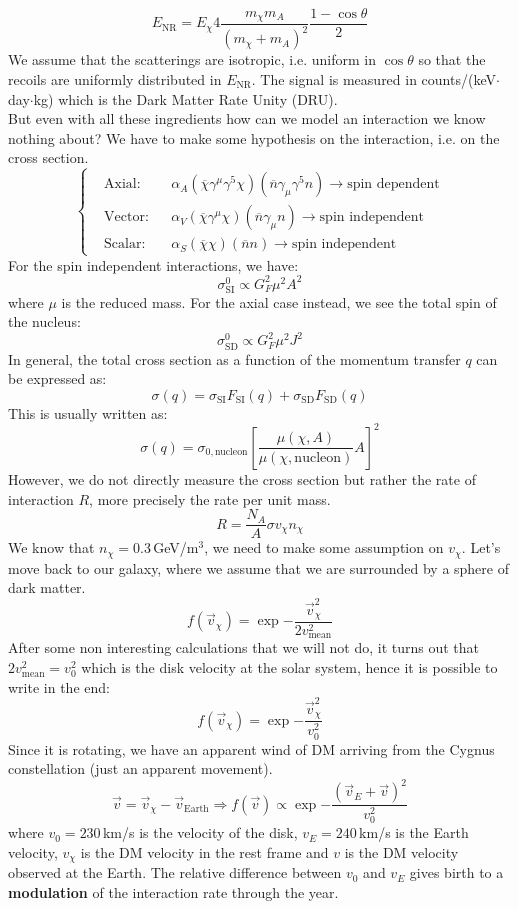\documentclass[10.75pt,a4paper,openright,bottom=2cm]{article}
\begin{document}
\[
E_{\text{NR}}=E_\chi 4\frac{m_\chi m_A}{(m_\chi+m_A)^2}\frac{1-\cos\theta}{2}
\]
We assume that the scatterings are isotropic, i.e. uniform in $\cos\theta$ so that the recoils are uniformly distributed in $E_{\text{NR}}$. The signal is measured in counts/(keV$\cdot$day$\cdot$kg) which is the Dark Matter Rate Unity (DRU).\\
But even with all these ingredients how can we model an interaction we know nothing about? We have to make some hypothesis on the interaction, i.e. on the cross section.
\[
\left\{
\begin{aligned}
&\text{Axial:}&&\alpha_A(\overline{\chi}\gamma^\mu\gamma^5\chi)(\overline{n}\gamma_\mu\gamma^5n)\to\text{spin dependent}\\
&\text{Vector:}&&\alpha_V(\overline{\chi}\gamma^\mu\chi)(\overline{n}\gamma_\mu n)\to\text{spin independent}\\
&\text{Scalar:}&&\alpha_S(\overline{\chi}\chi)(\overline{n}n)\to\text{spin independent}
\end{aligned}
\right.
\]
For the spin independent interactions, we have:
\[
\sigma_{\text{SI}}^0\propto G_F^2\mu^2A^2
\]
where $\mu$ is the reduced mass. For the axial case instead, we see the total spin of the nucleus:
\[
\sigma_{\text{SD}}^0\propto G_F^2\mu^2J^2
\]
In general, the total cross section as a function of the momentum transfer $q$ can be expressed as:
\[
\sigma(q)=\sigma_{\text{SI}}F_{\text{SI}}(q)+\sigma_{\text{SD}}F_{\text{SD}}(q)
\]
This is usually written as:
\[
\sigma(q)=\sigma_{0,\text{nucleon}}\left[\frac{\mu(\chi,A)}{\mu(\chi,\text{nucleon})}A\right]^2
\]
However, we do not directly measure the cross section but rather the rate of interaction $R$, more precisely the rate per unit mass.
\[
R=\frac{N_A}{A}\sigma v_\chi n_\chi
\]
We know that $n_\chi=0.3$\,GeV/m$^3$, we need to make some assumption on $v_\chi$. Let's move back to our galaxy, where we assume that we are surrounded by a sphere of dark matter.
\[
f(\Vec{v}_\chi)=\exp{-\frac{\Vec{v}_\chi^2}{2v_{\text{mean}}^2}}
\]
After some non interesting calculations that we will not do, it turns out that $2v_{\text{mean}}^2=v_0^2$ which is the disk velocity at the solar system, hence it is possible to write in the end:
\[
f(\Vec{v}_\chi)=\exp{-\frac{\Vec{v}_\chi^2}{v_0^2}}
\]
Since it is rotating, we have an apparent wind of DM arriving from the Cygnus constellation (just an apparent movement).
\[
\Vec{v}=\Vec{v}_\chi-\Vec{v}_{\text{Earth}}\Rightarrow f(\Vec{v})\propto\exp{-\frac{(\Vec{v}_E+\Vec{v})^2}{v_0^2}}
\]
where $v_0=230$\,km/s is the velocity of the disk, $v_E=240$\,km/s is the Earth velocity, $v_\chi$ is the DM velocity in the rest frame and $v$ is the DM velocity observed at the Earth. The relative difference between $v_0$ and $v_E$ gives birth to a \textbf{modulation} of the interaction rate through the year.
\end{document}
